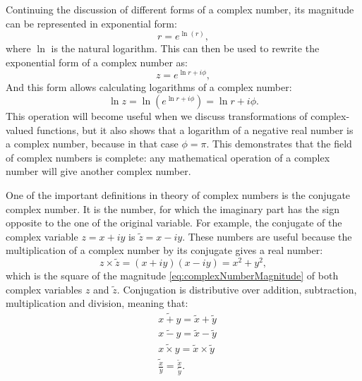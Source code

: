 \documentclass[
]{book}
\begin{document}
Continuing the discussion of different forms of a complex number, its magnitude can be represented in exponential form:
\begin{equation*}
    r = e^{\ln(r)},
\end{equation*}
where \(\ln\) is the natural logarithm. This can then be used to rewrite the exponential form of a complex number as:
\begin{equation}
    z = e^{\ln r + i \phi} ,
    \label{eq:complexNumberExponentialAll}
\end{equation}
And this form allows calculating logarithms of a complex number:
\begin{equation*}
    \ln z = \ln \left(e^{\ln r + i \phi} \right) = \ln r + i \phi .
\end{equation*}
This operation will become useful when we discuss transformations of complex-valued functions, but it also shows that a logarithm of a negative real number is a complex number, because in that case \(\phi=\pi\). This demonstrates that the field of complex numbers is complete: any mathematical operation of a complex number will give another complex number.

One of the important definitions in theory of complex numbers is the conjugate complex number. It is the number, for which the imaginary part has the sign opposite to the one of the original variable. For example, the conjugate of the complex variable \(z = x+ iy\) is \(\tilde{z} = x- iy\). These numbers are useful because the multiplication of a complex number by its conjugate gives a real number:
\begin{equation}
    z \times \tilde{z} = (x+ iy) (x- iy) = x^2 + y^2 ,
    \label{eq:complexNumberConjugateMulti}
\end{equation}
which is the square of the magnitude \eqref{eq:complexNumberMagnitude} of both complex variables \(z\) and \(\tilde{z}\). Conjugation is distributive over addition, subtraction, multiplication and division, meaning that:
\begin{equation}
    \begin{aligned}
        & \tilde{x + y} = \tilde{x} + \tilde{y} \\
        & \tilde{x - y} = \tilde{x} - \tilde{y} \\
        & \tilde{x \times y} = \tilde{x} \times \tilde{y} \\
        & \tilde{\frac{x}{y}} = \frac{\tilde{x}}{\tilde{y}} .
    \end{aligned}
    \label{eq:complexNumberConjugateDistributive}
\end{equation}
\end{document}
